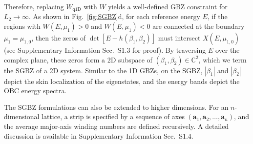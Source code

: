 Therefore, replacing $W_{\text{q1D}}$ with $W$ yields a well-defined GBZ constraint for $L_2 \rightarrow \infty$. 
As shown in Fig.~\ref{fig:SGBZ}d, for each reference energy $E$, if the regions with $W(E,\mu_1)>0$ and $W(E,\mu_1)<0$ are connected at the boundary $\mu_1 = \mu_{1,0}$, then the zeros of $\det[E-h(\beta_{1},\beta_{2})]$ must intersect $X(E,\mu_{1,0})$ (see Supplementary Information Sec.~S1.3 for proof).
By traversing $E$ over the complex plane, these zeros form a 2D subspace of $(\beta_1,\beta_2)\in \mathbb{C}^2$, which we term the SGBZ of a 2D system.
Similar to the 1D GBZs, on the SGBZ, $|\beta_1|$ and $|\beta_2|$ depict the skin localization of the eigenstates, and the energy bands depict the OBC energy spectra.

The SGBZ formulations can also be extended
to higher dimensions. For an $n$-dimensional lattice, a strip is
specified by a sequence of axes $(\mathbf{a}_{1},\mathbf{a}_{2},\dots,\mathbf{a}_{n})$,
and the  average major-axis winding numbers are defined recursively. A detailed
discussion is available in Supplementary Information Sec.~S1.4.



